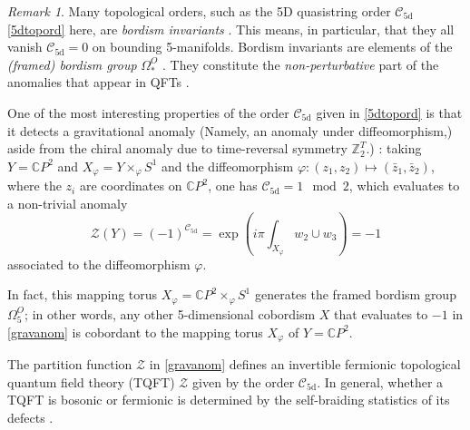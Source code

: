 \documentclass[onecolumn]{article}
\theoremstyle{theorem}
\theoremstyle{remark}
\newtheorem{remark}{Remark}[section]
\theoremstyle{example}
\theoremstyle{definition}
\numberwithin{equation}{section}
\def\bbZ{\mathbb{Z}}
\begin{document}
\begin{remark}
Many topological orders, such as the 5D quasistring order $\mathcal{C}_\text{5d}$ \eqref{5dtopord} here, are \textit{bordism invariants} \cite{JuvenWang,Witten:2019,Thorngren2015,Freed:2014}. This means, in particular, that they all vanish $\mathcal{C}_\text{5d}=0$ on bounding 5-manifolds. Bordism invariants are elements of the {\it (framed) bordism group} $\Omega^O_\ast$ \cite{Guo_2020,Freed_2021}. They constitute the {\it non-perturbative} part of the anomalies that appear in QFTs \cite{Freed:2014,Witten:2019}.
\end{remark}

One of the most interesting properties of the order $\mathcal{C}_\text{5d}$ given in \eqref{5dtopord} is that it detects a {gravitational anomaly} {(Namely, an anomaly under diffeomorphism,)} { {aside}} {from the chiral anomaly due to time-reversal symmetry $\bbZ_2^T$.)} \cite{JuvenWang,Thorngren2015}: taking $Y=\mathbb{C}P^2$ and $X_\varphi = Y\times_\varphi S^1$ 
 and the diffeomorphism $\varphi:(z_1,z_2)\mapsto (\bar{z}_1,\bar z_2)$, where the $z_i$ are coordinates on $\mathbb{C}P^2$, one has $\mathcal{C}_\text{5d}=1 \mod 2$, which evaluates to a non-trivial anomaly
\begin{equation}
    \mathcal{Z}(Y)=(-1)^{\mathcal{C}_\text{5d}} = \exp \left(i\pi \int_{X_\varphi} w_2\cup w_3\right) = -1\label{gravanom}
\end{equation}
associated to the diffeomorphism $\varphi$. 

In fact, this mapping torus $X_\varphi=\mathbb{C}P^2\times_\varphi S^1$ generates the framed bordism group $\Omega^O_5$; in other words, any other 5-dimensional cobordism $X$ that evaluates to $-1$ in \eqref{gravanom} is cobordant to the mapping torus $X_\varphi$ of $Y=\mathbb{C}P^2$.

The partition function $\mathcal{Z}$ in  \eqref{gravanom} defines an invertible { {fermionic}} topological quantum field theory (TQFT) $\mathcal{Z}$ \cite{Freed:2014,Witten:2019,Freed_2021} given by the order $\mathcal{C}_\text{5d}$. In general, whether a TQFT is bosonic or fermionic is determined by the {self-braiding statistics} of its defects \cite{XieChen:2013,Zhu:2019}.

\end{document}
